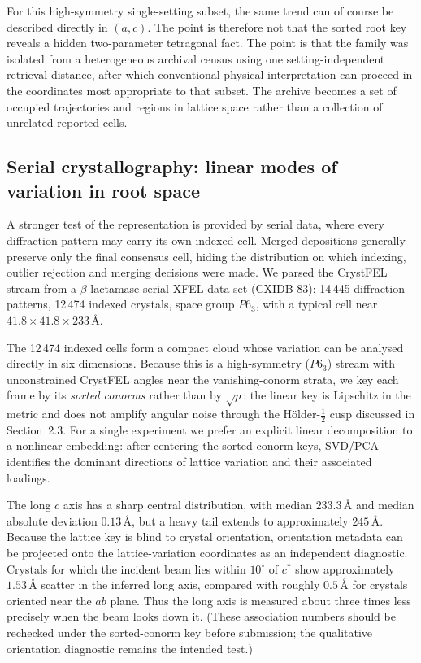 \documentclass[11pt]{article}
\newcommand{\Ang}{\text{\AA}}
\begin{document}
For this high-symmetry single-setting subset, the same trend can of course be described directly in $(a,c)$. The point is therefore not that the sorted root key reveals a hidden two-parameter tetragonal fact. The point is that the family was isolated from a heterogeneous archival census using one setting-independent retrieval distance, after which conventional physical interpretation can proceed in the coordinates most appropriate to that subset. The archive becomes a set of occupied trajectories and regions in lattice space rather than a collection of unrelated reported cells.

\subsection{Serial crystallography: linear modes of variation in root space}

A stronger test of the representation is provided by serial data, where every diffraction pattern may carry its own indexed cell. Merged depositions generally preserve only the final consensus cell, hiding the distribution on which indexing, outlier rejection and merging decisions were made. We parsed the CrystFEL stream from a $\beta$-lactamase serial XFEL data set (CXIDB 83): 14\,445 diffraction patterns, 12\,474 indexed crystals, space group $P6_3$, with a typical cell near $41.8\times 41.8\times233\,\Ang$.

The 12\,474 indexed cells form a compact cloud whose variation can be analysed directly in six dimensions. Because this is a high-symmetry ($P6_3$) stream with unconstrained CrystFEL angles near the vanishing-conorm strata, we key each frame by its \emph{sorted conorms} rather than by $\sqrt{p}$: the linear key is Lipschitz in the metric and does not amplify angular noise through the H\"older-$\tfrac12$ cusp discussed in Section~2.3. For a single experiment we prefer an explicit linear decomposition to a nonlinear embedding: after centering the sorted-conorm keys, SVD/PCA identifies the dominant directions of lattice variation and their associated loadings.

The long $c$ axis has a sharp central distribution, with median $233.3\,\Ang$ and median absolute deviation $0.13\,\Ang$, but a heavy tail extends to approximately $245\,\Ang$. Because the lattice key is blind to crystal orientation, orientation metadata can be projected onto the lattice-variation coordinates as an independent diagnostic. Crystals for which the incident beam lies within $10^\circ$ of $c^*$ show approximately $1.53\,\Ang$ scatter in the inferred long axis, compared with roughly $0.5\,\Ang$ for crystals oriented near the $ab$ plane. Thus the long axis is measured about three times less precisely when the beam looks down it. (These association numbers should be rechecked under the sorted-conorm key before submission; the qualitative orientation diagnostic remains the intended test.)
\end{document}
